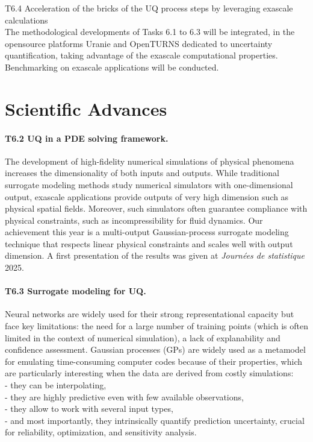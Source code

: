 T6.4 Acceleration of the bricks of the UQ process steps by leveraging exascale calculations\\
The methodological developments of Tasks 6.1 to 6.3 will be integrated, in the opensource platforms
Uranie and OpenTURNS dedicated to uncertainty quantification, taking advantage of the exascale
computational properties. Benchmarking on exascale applications will be conducted.


\section{Scientific Advances}

\paragraph{T6.2 UQ in a PDE solving framework.}
The development of high-fidelity numerical simulations of physical phenomena increases the dimensionality of both inputs and outputs. While traditional surrogate modeling methods study numerical simulators with one-dimensional output, exascale applications provide outputs of very high dimension such as physical spatial fields. Moreover, such simulators often guarantee compliance with physical constraints, such as incompressibility for fluid dynamics. Our achievement this year is a multi-output Gaussian-process surrogate modeling technique that respects linear physical constraints and scales well with output dimension. A first presentation of the results was given at \textit{Journées de statistique} 2025.


\paragraph{T6.3 Surrogate modeling for UQ.}
Neural networks are widely used for their strong representational capacity but face key limitations: the need for a large number of training points (which is often limited in the context of numerical simulation), a lack of explanability and confidence assessment.
Gaussian processes (GPs) are widely used as a metamodel for emulating time-consuming computer codes because of  their properties, which are particularly interesting when the data are derived from costly simulations:\\
- they can be interpolating,\\
- they are highly predictive even with few available observations,\\
- they allow to work with several input types,\\
- and most importantly, they intrinsically quantify prediction uncertainty, crucial for reliability, optimization, and sensitivity analysis.

